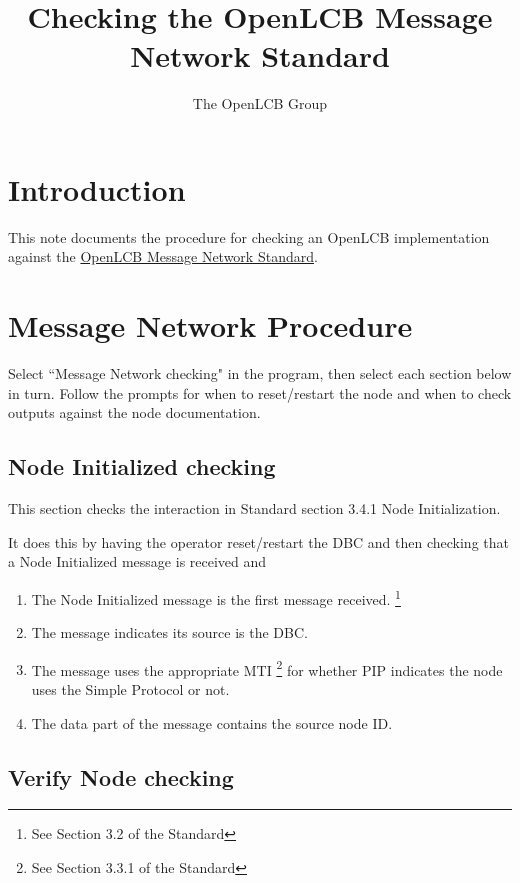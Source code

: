 \documentclass[11pt]{article}
\title{Checking the OpenLCB Message Network Standard}
\author{The OpenLCB Group}
\begin{document}
\maketitle


\section{Introduction}

This note documents the procedure for checking an OpenLCB implementation against the 
\href{https://nbviewer.org/github/openlcb/documents/blob/master/standards/MessageNetworkS.pdf}
    {OpenLCB Message Network Standard}.



\section{Message Network Procedure}

Select ``Message Network checking" in the program, 
then select each section below in turn.  Follow the prompts
for when to reset/restart the node and when to check 
outputs against the node documentation.

\subsection{Node Initialized checking}

This section checks the interaction in Standard section 3.4.1 Node Initialization.

It does this by having the operator reset/restart the DBC and then
checking that a Node Initialized message is received and
    \begin{enumerate}
    \item The Node Initialized message is the first message received.
            \footnote{See Section 3.2 of the Standard}
    \item The message indicates its source is the DBC.
    \item The message uses the appropriate MTI
            \footnote{See Section 3.3.1 of the Standard}
            for whether PIP indicates the node 
            uses the Simple Protocol or not.
    \item The data part of the message contains the source node ID.
    \end{enumerate}


\subsection{Verify Node checking}
\end{document}
